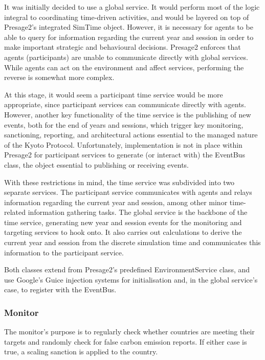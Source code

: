 It was initially decided to use a global service. It would perform most of the logic integral to coordinating time-driven activities, and would be layered on top of Presage2's integrated SimTime object. However, it is necessary for agents to be able to query for information regarding the current year and session in order to make important strategic and behavioural decisions. Presage2 enforces that agents (participants) are unable to communicate directly with global services. While agents can act on the environment and affect services, performing the reverse is somewhat more complex.

At this stage, it would seem a participant time service would be more appropriate, since participant services can communicate directly with agents. However, another key functionality of the time service is the publishing of new events, both for the end of years and sessions, which trigger key monitoring, sanctioning, reporting, and architectural actions essential to the managed nature of the Kyoto Protocol. Unfortunately, implementation is not in place within Presage2 for participant services to generate (or interact with) the EventBus class, the object essential to publishing or receiving events.

With these restrictions in mind, the time service was subdivided into two separate services. The participant service communicates with agents and relays information regarding the current year and session, among other minor time-related information gathering tasks. The global service is the backbone of the time service, generating new year and session events for the monitoring and targeting services to hook onto. It also carries out calculations to derive the current year and session from the discrete simulation time and communicates this information to the participant service.

Both classes extend from Presage2's predefined EnvironmentService class, and use Google's Guice injection systems for initialisation and, in the global service's case, to register with the EventBus.

\subsubsection{Monitor}

The monitor's purpose is to regularly check whether countries are meeting their targets and randomly check for false carbon emission reports. If either case is true, a scaling sanction is applied to the country.

